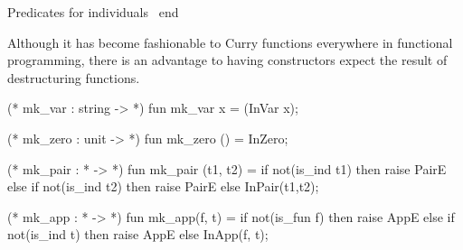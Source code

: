 \LA{}Predicates for individuals~{\nwtagstyle{}}\RA{}
end
\eatline
{}\nwendcode{}\nwdocspar
\begin{node}
Although it has become fashionable to Curry functions everywhere in
functional programming, there is an advantage to having constructors
expect the result of destructuring functions.
\end{node}
\nwenddocs{}\endmoddef\nwstartdeflinemarkup{}\nwenddeflinemarkup
(* mk_var : string ->  *)
fun mk_var x = (InVar x);

(* mk_zero : unit ->  *)
fun mk_zero () = InZero;

(* mk_pair :  *  ->  *)
fun mk_pair (t1, t2) =
  if not(is_ind t1) then raise PairE
  else if not(is_ind t2) then raise PairE
  else InPair(t1,t2);

(* mk_app :  *  ->  *)
fun mk_app(f, t) =
  if not(is_fun f) then raise AppE
  else if not(is_ind t) then raise AppE
  else InApp(f, t);

